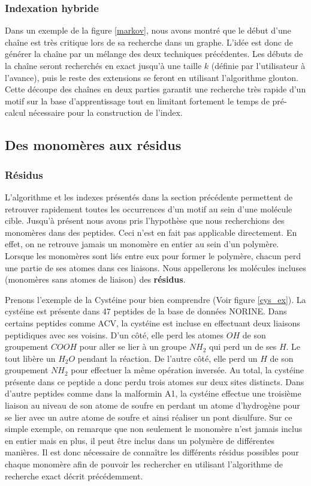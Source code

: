 \subsubsection{Indexation hybride}

Dans un exemple de la figure \ref{markov}, nous avons montré que le début d'une chaîne est très critique lors de sa recherche dans un graphe.
L'idée est donc de générer la chaîne par un mélange des deux techniques précédentes.
Les débuts de la chaîne seront recherchés en exact jusqu'à une taille $k$ (définie par l'utilisateur à l'avance), puis le reste des extensions se feront en utilisant l'algorithme glouton.
Cette découpe des chaînes en deux parties garantit une recherche très rapide d'un motif sur la base d'apprentissage tout en limitant fortement le temps de pré-calcul nécessaire pour la construction de l'index.



\subsection{Des monomères aux résidus}


\subsubsection{Résidus}

L'algorithme et les indexes présentés dans la section précédente permettent de retrouver rapidement toutes les occurrences d'un motif au sein d'une molécule cible.
Jusqu'à présent nous avons pris l'hypothèse que nous recherchions des monomères dans des peptides.
Ceci n'est en fait pas applicable directement.
En effet, on ne retrouve jamais un monomère en entier au sein d'un polymère.
Lorsque les monomères sont liés entre eux pour former le polymère, chacun perd une partie de ses atomes dans ces liaisons.
Nous appellerons les molécules incluses (monomères sans atomes de liaison) des \textbf{résidus}.

Prenons l'exemple de la Cystéine pour bien comprendre (Voir figure \ref{cys_ex}).
La cystéine est présente dans 47 peptides de la base de données NORINE.
Dans certains peptides comme ACV, la cystéine est incluse en effectuant deux liaisons peptidiques avec ses voisins.
D'un côté, elle perd les atomes $OH$ de son groupement $COOH$ pour aller se lier à un groupe $NH_2$ qui perd un de ses $H$. 
Le tout libère un $H_2O$ pendant la réaction.
De l'autre côté, elle perd un $H$ de son groupement $NH_2$ pour effectuer la même opération inversée.
Au total, la cystéine présente dans ce peptide a donc perdu trois atomes sur deux sites distincts.
Dans d'autre peptides comme dans la malformin A1, la cystéine effectue une troisième liaison au niveau de son atome de soufre en perdant un atome d'hydrogène pour se lier avec un autre atome de soufre et ainsi réaliser un pont disulfure.
Sur ce simple exemple, on remarque que non seulement le monomère n'est jamais inclus en entier mais en plus, il peut être inclus dans un polymère de différentes manières.
Il est donc nécessaire de connaître les différents résidus possibles pour chaque monomère afin de pouvoir les rechercher en utilisant l'algorithme de recherche exact décrit précédemment.

